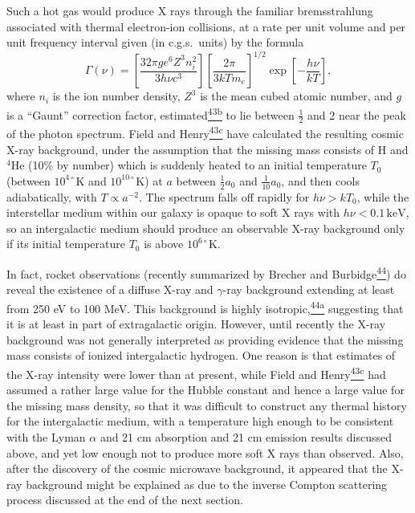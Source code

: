 Such a hot gas would produce X rays through the familiar bremsstrahlung
associated with thermal electron-ion collisions, at a rate per unit volume and
per unit frequency interval given (in c.g.s.\ units) by the formula
\[
  \Gamma(\nu)
  =
  \left[
    \frac{32\pi g e^6Z^3n_i^2}{3h\nu c^3}
  \right]
  \left[
    \frac{2\pi}{3kTm_e}
  \right]^{1/2}
  \exp\left[-\frac{h\nu}{kT}\right],
\]
where \(n_i\) is the ion number density, \(Z^3\) is the mean cubed atomic
number, and \(g\) is a ``Gaunt'' correction factor,
estimated\hyperref[ch15-ref-43b]{\textsuperscript{43b}} to lie between
\(\tfrac12\) and 2 near the peak of the photon spectrum. Field and
Henry\hyperref[ch15-ref-43c]{\textsuperscript{43c}} have calculated the
resulting cosmic X-ray background, under the assumption that the missing mass
consists of H and \({}^4\mathrm{He}\) (10\% by number) which is suddenly heated
to an initial temperature \(T_0\) (between \(10^{4\circ}\mathrm{K}\) and
\(10^{10\circ}\mathrm{K}\)) at \(a\) between \(\tfrac12a_0\) and
\(\tfrac1{10}a_0\), and then cools adiabatically, with \(T\propto a^{-2}\).
The spectrum falls off rapidly for \(h\nu>kT_0\), while the interstellar medium
within our galaxy is opaque to soft X rays with \(h\nu<0.1\,\mathrm{keV}\),
so an intergalactic medium should produce an observable X-ray background only
if its initial temperature \(T_0\) is above \(10^{6\circ}\mathrm{K}\).

In fact, rocket observations (recently summarized by Brecher and
Burbidge\hyperref[ch15-ref-44]{\textsuperscript{44}}) do reveal the existence
of a diffuse X-ray and \(\gamma\)-ray background extending at least from
250 eV to 100 MeV. This background is highly
isotropic,\hyperref[ch15-ref-44a]{\textsuperscript{44a}} suggesting that it
is at least in part of extragalactic origin. However, until recently the X-ray
background was not generally interpreted as providing evidence that the
missing mass consists of ionized intergalactic hydrogen. One reason is that
estimates of the X-ray intensity were lower than at present, while Field and
Henry\hyperref[ch15-ref-43c]{\textsuperscript{43c}} had assumed a rather
large value for the Hubble constant and hence a large value for the missing
mass density, so that it was difficult to construct any thermal history for
the intergalactic medium, with a temperature high enough to be consistent with
the Lyman \(\alpha\) and 21 cm absorption and 21 cm emission results discussed
above, and yet low enough not to produce more soft X rays than observed. Also,
after the discovery of the cosmic microwave background, it appeared that the
X-ray background might be explained as due to the inverse Compton scattering
process discussed at the end of the next section.

